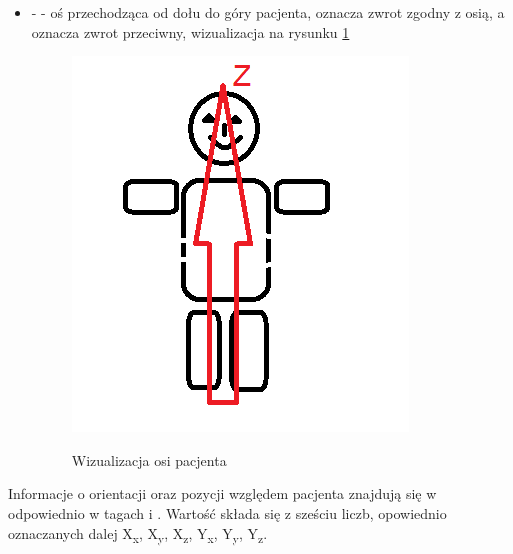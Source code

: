 \begin{itemize}
\begin{itemize}
        \item {} -  - oś przechodząca od dołu do góry pacjenta,  oznacza zwrot zgodny z osią, a  oznacza zwrot przeciwny, wizualizacja na rysunku \ref{fig:imageorientationindicator4}

        \begin{figure}[!htbp]
            \caption{Wizualizacja osi  pacjenta}
            \includegraphics[]{img/imageorientationindicator-103.png}
            \centering
            \label{fig:imageorientationindicator4}
        \end{figure}

    \end{itemize}

    Informacje o orientacji oraz pozycji względem pacjenta znajdują się w odpowiednio w tagach  i .
    Wartość  składa się z sześciu liczb, opowiednio oznaczanych dalej X\textsubscript{x}, X\textsubscript{y}, X\textsubscript{z}, Y\textsubscript{x}, Y\textsubscript{y}, Y\textsubscript{z}.


\end{itemize}
